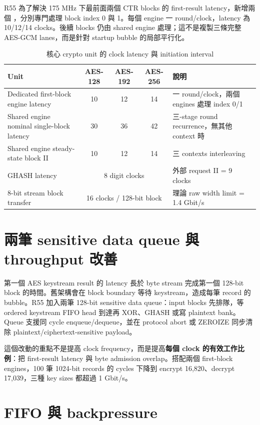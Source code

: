 \documentclass[UTF8,fontset=none,11pt,a4paper]{ctexrep}
\begin{document}
R55 為了解決 175 MHz 下最前面兩個 CTR blocks 的 first-result latency，新增兩個 ，分別專門處理 block index 0 與 1。每個 engine 一 round/clock，latency 為 10/12/14 clocks。後續 blocks 仍由 shared engine 處理；這不是複製三條完整 AES-GCM lanes，而是針對 startup bubble 的局部平行化。

\begin{table}[H]
\centering
\caption{核心 crypto unit 的 clock latency 與 initiation interval}
\begin{tabularx}{\linewidth}{l c c c X}
\toprule
Unit & AES-128 & AES-192 & AES-256 & 說明 \\
\midrule
Dedicated first-block engine latency & 10 & 12 & 14 & 一 round/clock，兩個 engines 處理 index 0/1 \\
Shared engine nominal single-block latency & 30 & 36 & 42 & 三-stage round recurrence，無其他 context 時 \\
Shared engine steady-state block II & 10 & 12 & 14 & 三 contexts interleaving \\
GHASH latency & \multicolumn{3}{c}{8 digit clocks} & 外部 request II = 9 clocks \\
8-bit stream block transfer & \multicolumn{3}{c}{16 clocks / 128-bit block} & 理論 raw width limit = 1.4 Gbit/s \\
\bottomrule
\end{tabularx}
\end{table}

\section{兩筆 sensitive data queue 與 throughput 改善}

第一個 AES keystream result 的 latency 長於 byte stream 完成第一個 128-bit block 的時間。舊架構會在 block boundary 等待 keystream，造成每筆 record 的 bubble。R55 加入兩筆 128-bit sensitive data queue：input blocks 先排隊，等 ordered keystream FIFO head 到達再 XOR、GHASH 或寫 plaintext bank。Queue 支援同 cycle enqueue/dequeue，並在 protocol abort 或 ZEROIZE 同步清除 plaintext/ciphertext-sensitive payload。

這個改動的重點不是提高 clock frequency，而是提高\textbf{每個 clock 的有效工作比例}：把 first-result latency 與 byte admission overlap。搭配兩個 first-block engines，100 筆 1024-bit records 的 cycles 下降到 encrypt 16,820、decrypt 17,039，三種 key sizes 都超過 1 Gbit/s。

\section{FIFO 與 backpressure}
\end{document}
